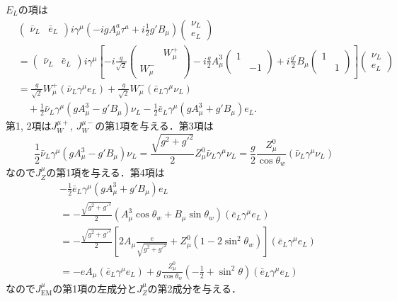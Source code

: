 $E_L$の項は
\begin{align*}
  &
  \begin{pmatrix}
    \bar{\nu}_L & \bar{e}_L
  \end{pmatrix}
  i\gamma^\mu \left( -igA_\mu^a \tau^a + i \frac{1}{2}g'B_\mu \right)
  \begin{pmatrix}
    \nu_L \\ e_L
  \end{pmatrix} \\
  &=
  \begin{pmatrix}
    \bar{\nu}_L & \bar{e}_L
  \end{pmatrix}
  i\gamma^\mu \left[ -i\frac{g}{\sqrt{2}}
  \begin{pmatrix}
    & W_\mu^+ \\ W_\mu^- &
  \end{pmatrix}
  - i \frac{g}{2} A_\mu^3
  \begin{pmatrix}
    1 & \\ & -1
  \end{pmatrix}
  + i \frac{g'}{2} B_\mu
  \begin{pmatrix}
    1 & \\ & 1
  \end{pmatrix}
  \right]
  \begin{pmatrix}
    \nu_L \\ e_L
  \end{pmatrix} \\
  &= \frac{g}{\sqrt{2}} W_\mu^+ (\bar{\nu}_L \gamma^\mu e_L)
  + \frac{g}{\sqrt{2}} W_\mu^- (\bar{e}_L \gamma^\mu \nu_L) \\
  &\quad + \frac{1}{2} \bar{\nu}_L \gamma^\mu (gA_\mu^3-g'B_\mu) \nu_L
  - \frac{1}{2} \bar{e}_L \gamma^\mu (gA_\mu^3+g'B_\mu) e_L .
\end{align*}
第1, 2項は$J_W^{\mu+}$, $J_W^{\mu-}$の第1項を与える．第3項は
\[
\frac{1}{2} \bar{\nu}_L \gamma^\mu (gA_\mu^3-g'B_\mu) \nu_L
= \frac{\sqrt{g^2+g'^2}}{2} Z_\mu^0 \bar{\nu}_L \gamma^\mu \nu_L
= \frac{g}{2} \frac{Z_\mu^0}{\cos\theta_w} (\bar{\nu}_L \gamma^\mu \nu_L)
\]
なので$J_Z^\mu$の第1項を与える．第4項は
\begin{align*}
  & -\frac{1}{2} \bar{e}_L \gamma^\mu (gA_\mu^3+g'B_\mu) e_L \\
  &= -\frac{\sqrt{g^2+g'^2}}{2} (A_\mu^3\cos\theta_w+B_\mu\sin\theta_w) (\bar{e}_L \gamma^\mu e_L) \\
  &= -\frac{\sqrt{g^2+g'^2}}{2} \left[ 2A_\mu \frac{e}{\sqrt{g^2+g'^2}} + Z_\mu^0(1-2\sin^2\theta_w) \right] (\bar{e}_L \gamma^\mu e_L) \\
  &= - eA_\mu (\bar{e}_L \gamma^\mu e_L)
  + g \frac{Z_\mu^0}{\cos\theta_w} \left( -\frac{1}{2}+\sin^2\theta \right) (\bar{e}_L \gamma^\mu e_L)
\end{align*}
なので$J_\text{EM}^\mu$の第1項の左成分と$J_Z^\mu$の第2成分を与える．


